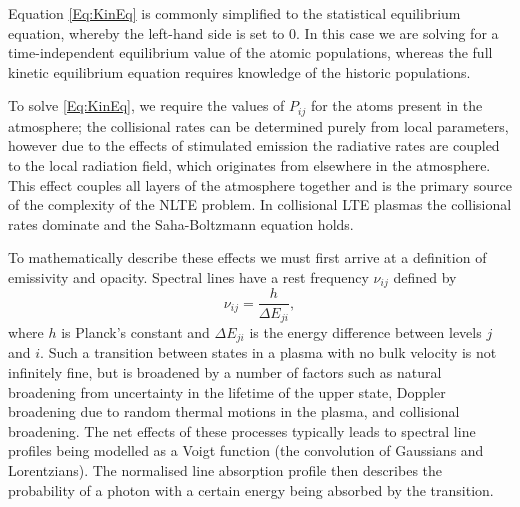 Equation \eqref{Eq:KinEq} is commonly simplified to the statistical equilibrium equation, whereby the left-hand side is set to 0. In this case we are solving for a time-independent equilibrium value of the atomic populations, whereas the full kinetic equilibrium equation requires knowledge of the historic populations.

To solve \eqref{Eq:KinEq}, we require the values of $P_{ij}$ for the atoms present in the atmosphere; the collisional rates can be determined purely from local parameters, however due to the effects of stimulated emission the radiative rates are coupled to the local radiation field, which originates from elsewhere in the atmosphere. This effect couples all layers of the atmosphere together and is the primary source of the complexity of the NLTE problem. In collisional LTE plasmas the collisional rates dominate and the Saha-Boltzmann equation holds.

To mathematically describe these effects we must first arrive at a definition of emissivity and opacity.
Spectral lines have a rest frequency $\nu_{ij}$  defined by
\begin{equation}
    \nu_{ij} = \frac{h}{\Delta E_{ji}},
\end{equation}
where $h$ is Planck's constant and $\Delta E_{ji}$ is the energy difference between levels $j$ and $i$.
Such a transition between states in a plasma with no bulk velocity is not infinitely fine, but is broadened by a number of factors such as natural broadening from uncertainty in the lifetime of the upper state, Doppler broadening due to random thermal motions in the plasma, and collisional broadening.
The net effects of these processes typically leads to spectral line profiles being modelled as a Voigt function (the convolution of Gaussians and Lorentzians). The normalised line absorption profile then describes the probability of a photon with a certain energy being absorbed by the transition.

